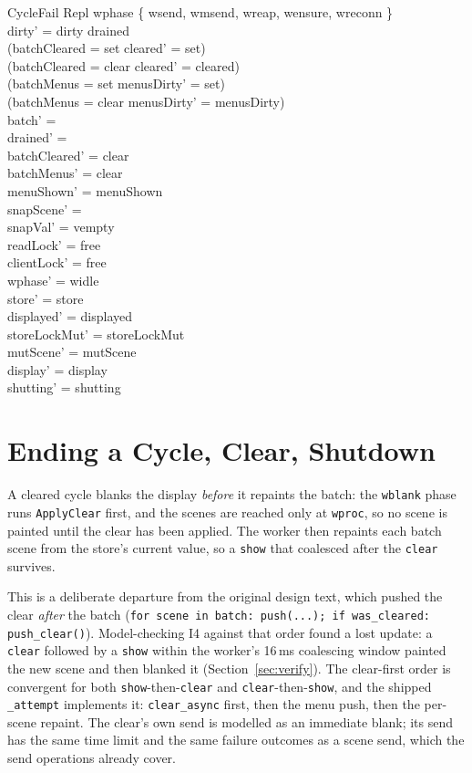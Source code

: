 \documentclass[a4paper,10pt,fleqn]{article}
\begin{document}
\begin{schema}{CycleFail}
  \Delta Repl
\where
  wphase \in \{ wsend, wmsend, wreap, wensure, wreconn \} \\
  dirty' = dirty \cup drained \\
  (batchCleared = set \implies cleared' = set) \\
  (batchCleared = clear \implies cleared' = cleared) \\
  (batchMenus = set \implies menusDirty' = set) \\
  (batchMenus = clear \implies menusDirty' = menusDirty) \\
  batch' = \emptyset \\
  drained' = \emptyset \\
  batchCleared' = clear \\
  batchMenus' = clear \\
  menuShown' = menuShown \\
  snapScene' = \emptyset \\
  snapVal' = vempty \\
  readLock' = free \\
  clientLock' = free \\
  wphase' = widle \\
  store' = store \\
  displayed' = displayed \\
  storeLockMut' = storeLockMut \\
  mutScene' = mutScene \\
  display' = display \\
  shutting' = shutting
\end{schema}

\section{Ending a Cycle, Clear, Shutdown}

A cleared cycle blanks the display \emph{before} it repaints the batch: the
\texttt{wblank} phase runs \texttt{ApplyClear} first, and the scenes are
reached only at \texttt{wproc}, so no scene is painted until the clear has
been applied.  The worker then repaints each batch scene from the store's
current value, so a \texttt{show} that coalesced after the \texttt{clear}
survives.

This is a deliberate departure from the original design text, which pushed
the clear \emph{after} the batch (\texttt{for scene in batch: push(...); if
was\_cleared: push\_clear()}).  Model-checking I4 against that order found a
lost update: a \texttt{clear} followed by a \texttt{show} within the
worker's 16\,ms coalescing window painted the new scene and then blanked it
(Section~\ref{sec:verify}).  The clear-first order is convergent for both
\texttt{show}-then-\texttt{clear} and \texttt{clear}-then-\texttt{show}, and
the shipped \texttt{\_attempt} implements it: \texttt{clear\_async} first,
then the menu push, then the per-scene repaint.  The clear's own send is
modelled as an immediate blank; its send has the same time limit and the same
failure outcomes as a scene send, which the send operations already cover.
\end{document}
